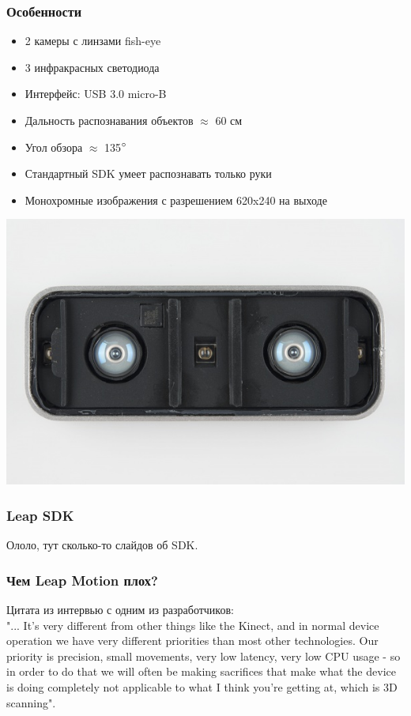 \documentclass{beamer}
\begin{document}
		\begin{frame}
			\frametitle{Особенности}
			
			\begin{itemize}
				\item 2 камеры с линзами fish-eye
				\item 3 инфракрасных светодиода
				\item Интерфейс: USB 3.0 micro-B
				\item Дальность распознавания объектов $\approx$ 60 см
				\item Угол обзора $\approx$ 135$\degree$
				\item Стандартный SDK умеет распознавать только руки
				\item Монохромные изображения с разрешением 620x240 на выходе
			\end{itemize}
			
			\begin{center}
				\includegraphics[scale=0.25]{LeapMotionDisassembled}
			\end{center}
		\end{frame}
		
		\begin{frame}
			\frametitle{Leap SDK}
			
			Ололо, тут сколько-то слайдов об SDK.
		\end{frame}
		
		\begin{frame}
			\frametitle{Чем Leap Motion плох?}
			
			Цитата из интервью с одним из разработчиков:\\
			"... It’s very different from other things like the Kinect, and in normal device
			operation we have very different priorities than most other technologies.
			Our priority is precision, small movements, very low latency, very low CPU
			usage - so in order to do that we will often be making sacrifices that make
			what the device is doing completely not applicable to what I think you’re
			getting at, which is 3D scanning".
		\end{frame}
		
\end{document}
